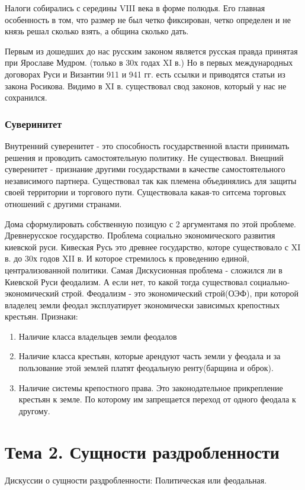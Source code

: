 \documentclass[a4paper]{article}
\begin{document}
Налоги собирались с середины VIII века в форме полюдья. Его главная особенность в том, что размер не был четко фиксирован, четко определен и не князь решал сколько взять, а община сколько дать.

Первым из дошедших до нас русским законом является русская правда принятая при Ярославе Мудром. (только в 30х годах XI в.) Но в первых международных договорах Руси и Византии 911 и 941 гг. есть ссылки и приводятся статьи из закона Росикова. Видимо в XI в. существовал свод законов, который у нас не сохранился.

\subsubsection{Суверинитет}
Внутренний суверенитет - это способность государственной власти принимать решения и проводить самостоятельную политику. Не существовал.
Внещний суверенитет - признание другими государствами в качестве самостоятельного независимого партнера.
Существовал так как племена объединялись для защиты своей территории и торгового пути. Существовала какая-то ситсема торговых отношений с другими странами.

Дома сформулировать собственную позицую с 2 аргументамя по этой проблеме.
Древнерусское государство. Проблема социально экономического развития киевской руси.
Кивеская Русь это древнее государство, которе существовало с XI в. до 30х годов XII в. И которое стремилось к проведению единой, централизованной политики. Самая Дискусионная проблема - сложился ли в Киевской Руси феодализм. А если нет, то какой тогда существовал социально-экономический строй.
Феодализм - это экономический строй(ОЭФ), при которой владелец земли феодал эксплуатирует экономически зависимых крепостных крестьян.
Признаки: 
\begin{enumerate}
    \item Наличие класса владельцев земли феодалов
    \item Наличие класса крестьян, которые арендуют часть земли у феодала и за пользование этой землей платят феодальную ренту(барщина и оброк).
    \item Наличие системы крепостного права. Это законодательное прикрепление крестьян к земле. По которому им запрещается переход от одного феодала к другому.
\end{enumerate}

\section{Тема 2. Сущности раздробленности}
Дискуссии о сущности раздробленности:
Политическая или феодальная.
\end{document}

